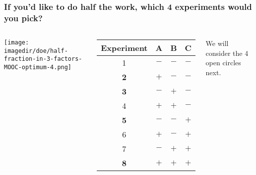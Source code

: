 \begin{frame}\frametitle{If you'd like to do half the work, which 4 experiments would you pick?}
	\begin{columns}
			\begin{center}
				\texttt{[image: \\imagedir/doe/half-fraction-in-3-factors-MOOC-optimum-4.png]}
			\end{center}
			
			\begin{tabulary}{\linewidth}{|c||c|c|c|}\hline 
				\textsf{\relax Experiment } & \textbf{\relax A } & \textbf{\relax B } & \textbf{\relax C } \\
				\hline \color{lightgray} 1 & \color{lightgray} \(-\) & \color{lightgray}\(-\) & \color{lightgray}\(-\) \\
				\hline \color{myOrange} \textbf{2} & \(+\) & \(-\) & \(-\) \\
				\hline \color{myOrange} \textbf{3} & \(-\) & \(+\) & \(-\) \\
				\hline \color{lightgray}4 & \color{lightgray}\(+\) & \color{lightgray}\(+\) & \color{lightgray}\(-\) \\
				\hline \color{myOrange} \textbf{5} & \(-\) & \(-\) & \(+\) \\
				\hline \color{lightgray}6 & \color{lightgray}\(+\) & \color{lightgray}\(-\) & \color{lightgray}\(+\) \\
				\hline \color{lightgray}7 & \color{lightgray}\(-\) & \color{lightgray}\(+\) & \color{lightgray}\(+\) \\
				\hline \color{myOrange} \textbf{8} & \(+\) & \(+\) & \(+\) \\
				\hline
			\end{tabulary}
			
			\vspace{1cm}
			{\color{myOrange} We will consider the 4 open circles next.}
	\end{columns}	

\end{frame}

